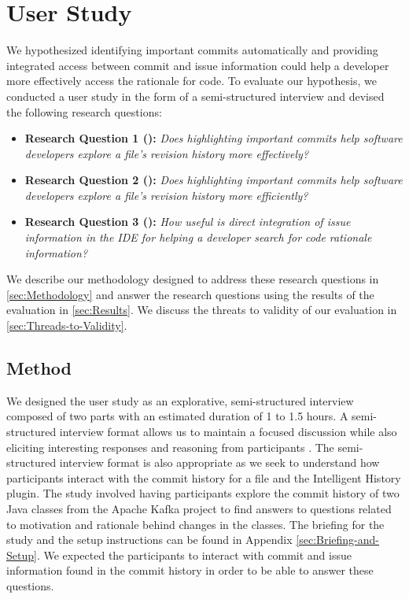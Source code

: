 \chapter{User Study}
\label{ch:Evaluation}

We hypothesized identifying important commits automatically and providing integrated access between commit and issue information could help a developer more effectively access the rationale for code.
To evaluate our hypothesis, we conducted a user study in the form of a semi-structured interview and devised the following research questions:

\begin{itemize}[leftmargin=*]
    \item[] \label{itm:RQ1} \textbf{Research Question 1 ():} \textit{Does highlighting important commits help software developers explore a file’s revision history more effectively?}
    \item[] \label{itm:RQ2} \textbf{Research Question 2 ():} \textit{Does highlighting important commits help software developers explore a file’s revision history more efficiently?}
    \item[] \label{itm:RQ3} \textbf{Research Question 3 ():} \textit{How useful is direct integration of issue information in the IDE for helping a developer search for code rationale information?}
  \end{itemize}

We describe our methodology designed to address these research questions in \autoref{sec:Methodology} and answer the research questions using the results of the evaluation in \autoref{sec:Results}.
We discuss the threats to validity of our evaluation in \autoref{sec:Threads-to-Validity}.

\section{Method}
\label{sec:Methodology}

We designed the user study as an explorative, semi-structured interview composed of two parts with an estimated duration of 1 to 1.5 hours.
A semi-structured interview format allows us to maintain a focused discussion while also eliciting interesting responses and reasoning from participants \cite{shull_guide_2007}.
The semi-structured interview format is also appropriate as we seek to understand how participants interact with the commit history for a file and the Intelligent History plugin.
The study involved having participants explore the commit history of two Java classes from the Apache Kafka project to find answers to questions related to motivation and rationale behind changes in the classes.
The briefing for the study and the setup instructions can be found in Appendix \ref{sec:Briefing-and-Setup}.
We expected the participants to interact with commit and issue information found in the commit history in order to be able to answer these questions.

